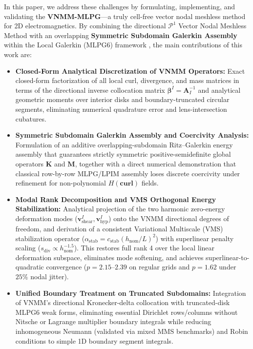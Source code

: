\documentclass[VANCOUVER,Times1COL]{WileyNJD-v5}
\begin{document}
In this paper, we address these challenges by formulating, implementing, and validating the \textbf{VNMM-MLPG}---a truly cell-free vector nodal meshless method for 2D electromagnetics. By combining the directional $\mathcal{P}^1$ Vector Nodal Meshless Method \cite{ortiz2021nodal, stable_vnmm2d_2026} with an overlapping \textbf{Symmetric Subdomain Galerkin Assembly} within the Local Galerkin (MLPG6) framework \cite{atluri2002meshless}, the main contributions of this work are:
\begin{itemize}
    \item \textbf{Closed-Form Analytical Discretization of VNMM Operators:} Exact closed-form factorization of all local curl, divergence, and mass matrices in terms of the directional inverse collocation matrix $\boldsymbol{\beta}^I = \mathbf{A}_I^{-1}$ and analytical geometric moments over interior disks and boundary-truncated circular segments, eliminating numerical quadrature error and lens-intersection cubatures.
    \item \textbf{Symmetric Subdomain Galerkin Assembly and Coercivity Analysis:} Formulation of an additive overlapping-subdomain Ritz--Galerkin energy assembly that guarantees strictly symmetric positive-semidefinite global operators $\mathbf{K}$ and $\mathbf{M}$, together with a direct numerical demonstration that classical row-by-row MLPG/LPIM assembly loses discrete coercivity under refinement for non-polynomial $H(\mathbf{curl})$ fields.
    \item \textbf{Modal Rank Decomposition and VMS Orthogonal Energy Stabilization:} Analytical projection of the two harmonic zero-energy deformation modes ($\mathbf{v}_{\mathrm{shear}}^I, \mathbf{v}_{\mathrm{hyp}}^I$) onto the VNMM directional degrees of freedom, and derivation of a consistent Variational Multiscale (VMS) stabilization operator ($\alpha_{\mathrm{stab}} = c_{\mathrm{stab}}(h_{\mathrm{nom}}/L)^2$) with superlinear penalty scaling ($s_{\mathrm{div}} \propto h_{\mathrm{nom}}^{-1.5}$). This restores full rank 4 over the local linear deformation subspace, eliminates mode softening, and achieves superlinear-to-quadratic convergence ($p = 2.15\text{--}2.39$ on regular grids and $p = 1.62$ under $25\%$ nodal jitter).
    \item \textbf{Unified Boundary Treatment on Truncated Subdomains:} Integration of VNMM's directional Kronecker-delta collocation \cite{ortiz2021nodal, stable_vnmm2d_2026} with truncated-disk MLPG6 weak forms, eliminating essential Dirichlet rows/columns without Nitsche or Lagrange multiplier boundary integrals while reducing inhomogeneous Neumann (validated via mixed MMS benchmarks) and Robin conditions to simple 1D boundary segment integrals.

\end{itemize}
\end{document}

